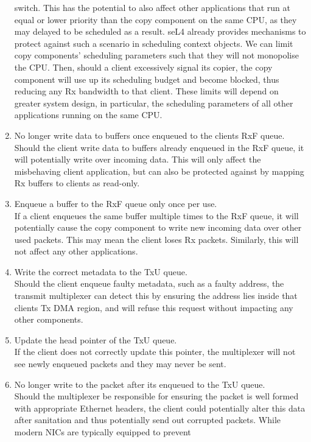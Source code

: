 \begin{enumerate}
    switch. This has the potential to also affect other applications that run at equal or lower priority than the copy component on 
    the same CPU, as they may delayed to be scheduled as a result. seL4 already provides mechanisms to protect against such a scenario in 
    scheduling context objects. We can limit copy components' scheduling parameters such that they will not monopolise the CPU. Then, should 
    a client excessively signal its copier, the copy component will use up its scheduling budget and become blocked, thus reducing any Rx 
    bandwidth to that client. These limits
    will depend on greater system design, in particular, the scheduling parameters of all other applications running on the same CPU.
    \item No longer write data to buffers once enqueued to the clients RxF queue.\\
    Should the client write data to buffers already enqueued in the RxF queue, it will potentially write over incoming data. This will only
    affect the misbehaving client application, but can also be protected against by mapping Rx buffers to clients as read-only.
    \item Enqueue a buffer to the RxF queue only once per use.\\
    If a client enqueues the same buffer multiple times to the RxF queue, it will potentially cause the copy component to write new incoming
    data over other used packets. This may mean the client loses Rx packets. Similarly, this will not affect any other applications.
    \item Write the correct metadata to the TxU queue.\\
    Should the client enqueue faulty metadata, such as a faulty address, the transmit multiplexer can detect this by ensuring the address lies inside
    that clients Tx DMA region, and will refuse this request without impacting any other components.
    \item Update the head pointer of the TxU queue.\\
    If the client does not correctly update this pointer, the multiplexer will not see newly enqueued packets and they may never be sent.
    \item No longer write to the packet after its enqueued to the TxU queue.\\
    Should the multiplexer be responsible for ensuring the packet is well formed with appropriate Ethernet headers, the client could potentially
    alter this data after sanitation and thus potentially send out corrupted packets. While modern NICs are typically equipped to prevent

\end{enumerate}
